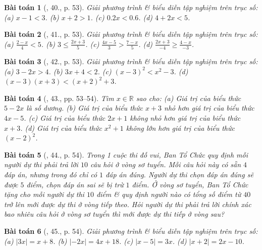 \documentclass{article}
\newtheorem{baitoan}{Bài toán}
\begin{document}
\begin{baitoan}[\cite{SGK_Toan_8_tap_2}, 40., p. 53]
	Giải phương trình \& biểu diễn tập nghiệm trên trục số: (a) $x - 1 < 3$. (b) $x + 2 > 1$. (c) $0.2x < 0.6$. (d) $4 + 2x < 5$.
\end{baitoan}

\begin{baitoan}[\cite{SGK_Toan_8_tap_2}, 41., p. 53]
	Giải phương trình \& biểu diễn tập nghiệm trên trục số: (a) $\frac{2 - x}{4} < 5$. (b) $3\le\frac{2x + 3}{5}$. (c) $\frac{4x - 5}{3} > \frac{7 - x}{5}$. (d) $\frac{2x + 3}{-4}\ge\frac{4 - x}{-3}$.
\end{baitoan}

\begin{baitoan}[\cite{SGK_Toan_8_tap_2}, 42., p. 53]
	Giải phương trình \& biểu diễn tập nghiệm trên trục số: (a) $3 - 2x > 4$. (b) $3x + 4 < 2$. (c) $(x - 3)^2 < x^2 - 3$. (d) $(x - 3)(x + 3) < (x + 2)^2 + 3$.
\end{baitoan}

\begin{baitoan}[\cite{SGK_Toan_8_tap_2}, 43., pp. 53--54]
	Tìm $x\in\mathbb{R}$ sao cho: (a) Giá trị của biểu thức $5 - 2x$ là số dương. (b) Giá trị của biểu thức $x + 3$ nhỏ hơn giá trị của biểu thức $4x - 5$. (c) Giá trị của biểu thức $2x + 1$ không nhỏ hơn giá trị của biểu thức $x + 3$. (d) Giá trị của biểu thức $x^2 + 1$ không lớn hơn giá trị của biểu thức $(x - 2)^2$.
\end{baitoan}

\begin{baitoan}[\cite{SGK_Toan_8_tap_2}, 44., p. 54]
	Trong 1 cuộc thi đố vui, Ban Tổ Chức quy định mỗi người dự thi phải trả lời $10$ câu hỏi ở vòng sơ tuyển. Mỗi câu hỏi này có sẵn $4$ đáp án, nhưng trong đó chỉ có $1$ đáp án đúng. Người dự thi chọn đáp án đúng sẽ được $5$ điểm, chọn đáp án sai sẽ bị trừ $1$ điểm. Ở vòng sơ tuyển, Ban Tổ Chức tặng cho mỗi người dự thi $10$ điểm \& quy định người nào có tổng số điểm từ $40$ trở lên mới được dự thi ở vòng tiếp theo. Hỏi người dự thi phải trả lời chính xác bao nhiêu câu hỏi ở vòng sơ tuyển thì mới được dự thi tiếp ở vòng sau?
\end{baitoan}

\begin{baitoan}[\cite{SGK_Toan_8_tap_2}, 45., p. 54]
	Giải phương trình \& biểu diễn tập nghiệm trên trục số: (a) $|3x| = x + 8$. (b) $|-2x| = 4x + 18$. (c) $|x - 5| = 3x$. (d) $|x + 2| = 2x - 10$.
\end{baitoan}


\printbibliography[heading=bibintoc]
	
\end{document}
